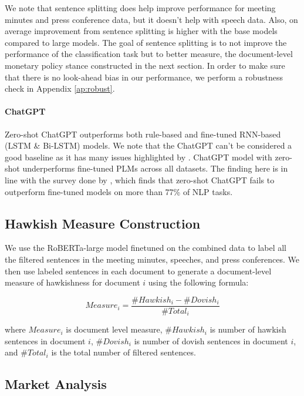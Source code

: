 \documentclass[11pt]{article}
\begin{document}
We note that sentence splitting does help improve performance for meeting minutes and press conference data, but it doesn't help with speech data. Also, on average improvement from sentence splitting is higher with the base models compared to large models. The goal of sentence splitting is to not improve the performance of the classification task but to better measure, the document-level monetary policy stance constructed in the next section. In order to make sure that there is no look-ahead bias in our performance, we perform a robustness check in Appendix \ref{ap:robust}. 

\paragraph{ChatGPT} 
Zero-shot ChatGPT outperforms both rule-based and fine-tuned RNN-based (LSTM \& Bi-LSTM) models. We note that the ChatGPT can't be considered a good baseline as it has many issues highlighted by \citet{rogers-etal-2023-closed}. ChatGPT model with zero-shot underperforms fine-tuned PLMs across all datasets. The finding here is in line with the survey done by \citet{pikuliak_chatgpt_survey}, which finds that zero-shot ChatGPT fails to outperform fine-tuned models on more than 77\% of NLP tasks. 


\subsection{Hawkish Measure Construction}
We use the RoBERTa-large model finetuned on the combined data to label all the filtered sentences in the meeting minutes, speeches, and press conferences. We then use labeled sentences in each document to generate a document-level measure of hawkishness for document $i$ using the following formula:

\begin{equation*}
    Measure_{i} = \frac{\#Hawkish_{i} - \#Dovish_{i}}{\#Total_{i}}
\end{equation*}

where $Measure_{i}$ is document level measure, $\#Hawkish_{i}$ is number of hawkish sentences in document $i$, $\#Dovish_{i}$ is number of dovish sentences in document $i$, and $\#Total_{i}$ is the total number of filtered sentences. 




\subsection{Market Analysis}
\end{document}
